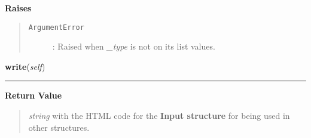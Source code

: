 \begin{boxedminipage}{\funcwidth}
\begin{quote}
      \end{quote}

      \textbf{Raises}
    \vspace{-1ex}

      \begin{quote}
        \begin{description}

          \item[\texttt{ArgumentError}]


: Raised when \emph{\_type} is not on its list values.
        \end{description}

      \end{quote}

    \end{boxedminipage}

    \label{module_Web:Input:write}

    \vspace{0.5ex}

\hspace{.8\funcindent}\begin{boxedminipage}{\funcwidth}

    \raggedright \textbf{write}(\textit{self})

    \vspace{-1.5ex}

    \rule{\textwidth}{0.5\fboxrule}
\setlength{\parskip}{2ex}
\setlength{\parskip}{1ex}
      \textbf{Return Value}
    \vspace{-1ex}

      \begin{quote}

\emph{string} with the HTML code for the \textbf{Input structure} for being used in other structures.
      \end{quote}

    \end{boxedminipage}



